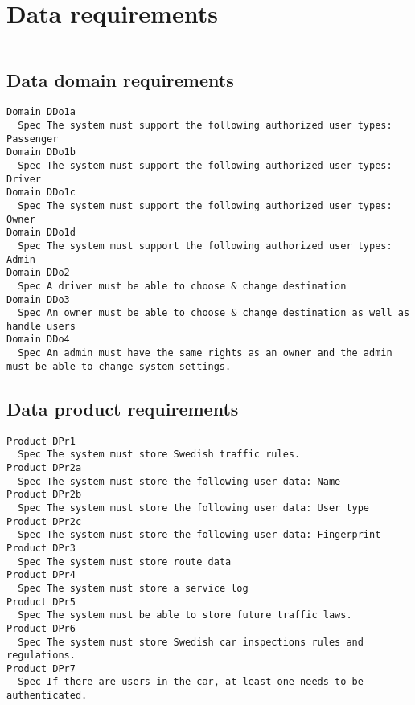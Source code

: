         
       \section{Data requirements}


\begin{lstlisting}

\end{lstlisting}


       \subsection{Data domain requirements}


\begin{lstlisting}
Domain DDo1a
  Spec The system must support the following authorized user types: Passenger
Domain DDo1b
  Spec The system must support the following authorized user types: Driver
Domain DDo1c
  Spec The system must support the following authorized user types: Owner
Domain DDo1d
  Spec The system must support the following authorized user types: Admin
Domain DDo2
  Spec A driver must be able to choose & change destination
Domain DDo3
  Spec An owner must be able to choose & change destination as well as handle users
Domain DDo4
  Spec An admin must have the same rights as an owner and the admin must be able to change system settings.

\end{lstlisting}
    
        
       \subsection{Data product requirements}


\begin{lstlisting}
Product DPr1
  Spec The system must store Swedish traffic rules.
Product DPr2a
  Spec The system must store the following user data: Name
Product DPr2b
  Spec The system must store the following user data: User type
Product DPr2c
  Spec The system must store the following user data: Fingerprint
Product DPr3
  Spec The system must store route data
Product DPr4
  Spec The system must store a service log
Product DPr5
  Spec The system must be able to store future traffic laws.
Product DPr6
  Spec The system must store Swedish car inspections rules and regulations.
Product DPr7
  Spec If there are users in the car, at least one needs to be authenticated.

\end{lstlisting}
    
